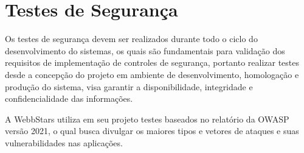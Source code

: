 \section{Testes de Segurança}

Os testes de segurança devem ser realizados durante todo o ciclo do desenvolvimento do sistemas, os quais são fundamentais para validação dos requisitos de implementação de controles de segurança, portanto realizar testes desde a concepção do projeto em ambiente de desenvolvimento, homologação e produção do sistema, visa garantir a disponibilidade, integridade e confidencialidade das informações.

A WebbStars utiliza em seu projeto testes baseados no relatório da \gls{OWASP} versão 2021, o qual busca divulgar os maiores tipos e vetores de ataques e suas vulnerabilidades nas aplicações.


